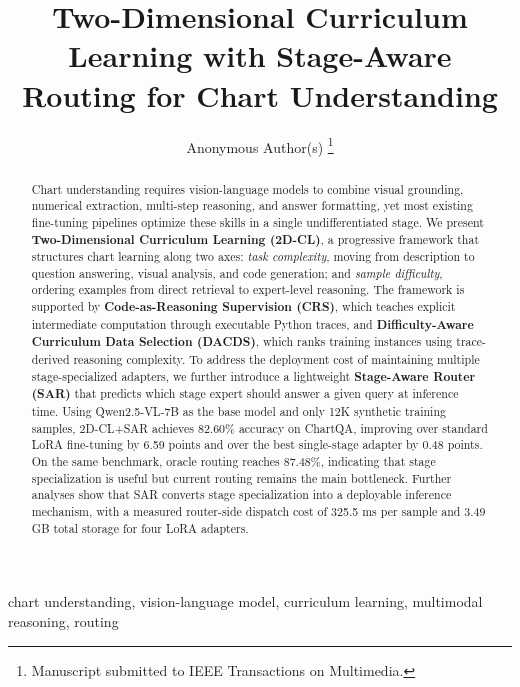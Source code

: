 \documentclass[journal]{IEEEtran}
\newcommand{\method}{2D-CL}
\newcommand{\fullmethod}{Two-Dimensional Curriculum Learning}
\newcommand{\crs}{CRS}
\newcommand{\dacds}{DACDS}
\newcommand{\sar}{SAR}
\begin{document}
\title{Two-Dimensional Curriculum Learning with Stage-Aware Routing for Chart Understanding}

\author{Anonymous Author(s)%
\thanks{Manuscript submitted to IEEE Transactions on Multimedia.}}

\maketitle

\begin{abstract}
Chart understanding requires vision-language models to combine visual grounding, numerical extraction, multi-step reasoning, and answer formatting, yet most existing fine-tuning pipelines optimize these skills in a single undifferentiated stage.
We present \textbf{\fullmethod{} (\method{})}, a progressive framework that structures chart learning along two axes: \textit{task complexity}, moving from description to question answering, visual analysis, and code generation; and \textit{sample difficulty}, ordering examples from direct retrieval to expert-level reasoning.
The framework is supported by \textbf{Code-as-Reasoning Supervision (\crs{})}, which teaches explicit intermediate computation through executable Python traces, and \textbf{Difficulty-Aware Curriculum Data Selection (\dacds{})}, which ranks training instances using trace-derived reasoning complexity.
To address the deployment cost of maintaining multiple stage-specialized adapters, we further introduce a lightweight \textbf{Stage-Aware Router (\sar{})} that predicts which stage expert should answer a given query at inference time.
Using Qwen2.5-VL-7B as the base model and only 12K synthetic training samples, \method{}+\sar{} achieves 82.60\% accuracy on ChartQA, improving over standard LoRA fine-tuning by 6.59 points and over the best single-stage adapter by 0.48 points.
On the same benchmark, oracle routing reaches 87.48\%, indicating that stage specialization is useful but current routing remains the main bottleneck.
Further analyses show that \sar{} converts stage specialization into a deployable inference mechanism, with a measured router-side dispatch cost of 325.5 ms per sample and 3.49 GB total storage for four LoRA adapters.
\end{abstract}

\begin{IEEEkeywords}
chart understanding, vision-language model, curriculum learning, multimodal reasoning, routing
\end{IEEEkeywords}
\end{document}
